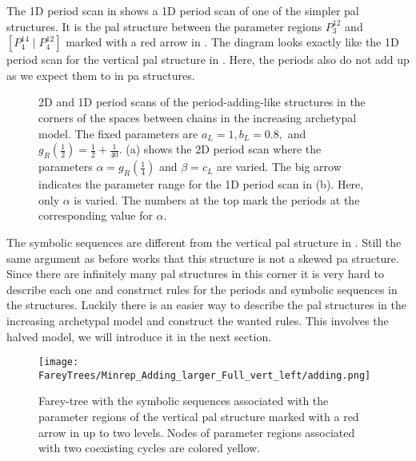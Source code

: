 The 1D period scan in  shows a 1D period scan of one of the simpler \gls{pal} structures.
It is the \gls{pal} structure between the parameter regions $P^{12}_3$ and $\left[P^{14}_4 \mid P^{12}_4\right]$ marked with a red arrow in .
The diagram looks exactly like the 1D period scan for the vertical \gls{pal} structure in .
Here, the periods also do not add up as we expect them to in \gls{pa} structures.

\begin{figure}
	\centering
	\caption[2D and 1D period scans of period-adding-like structures in the corners of the spaces between chains in the increasing archetypal model]{
		2D and 1D period scans of the period-adding-like structures in the corners of the spaces between chains in the increasing archetypal model.
		The fixed parameters are $a_L = 1, b_L = 0.8,$ and $g_R\left(\frac{1}{2}\right) = \frac{1}{2} + \frac{1}{40}$.
		(a) shows the 2D period scan where the parameters $\alpha = g_R\left(\frac{1}{4}\right)$ and $\beta = c_L$ are varied.
		The big arrow indicates the parameter range for the 1D period scan in (b).
		Here, only $\alpha$ is varied.
		The numbers at the top mark the periods at the corresponding value for $\alpha$.
	}
	\label{fig:add.add.like.corn}
\end{figure}

The symbolic sequences are different from the vertical \gls{pal} structure in .
Still the same argument as before works that this structure is not a skewed \gls{pa} structure.
Since there are infinitely many \gls{pal} structures in this corner it is very hard to describe each one and construct rules for the periods and symbolic sequences in the structures.
Luckily there is an easier way to describe the \gls{pal} structures in the increasing archetypal model and construct the wanted rules.
This involves the halved model, we will introduce it in the next section.

\begin{figure}
	\centering
	\texttt{[image: FareyTrees/Minrep\_Adding\_larger\_Full\_vert\_left/adding.png]}
	\caption[Farey-tree with the symbolic sequences of a vertical  structure]{
		Farey-tree with the symbolic sequences associated with the parameter regions of the vertical \gls{pal} structure marked with a red arrow in  up to two levels.
		Nodes of parameter regions associated with two coexisting cycles are colored yellow.
	}
	\label{fig:add.add.like.vert.tree}
\end{figure}
